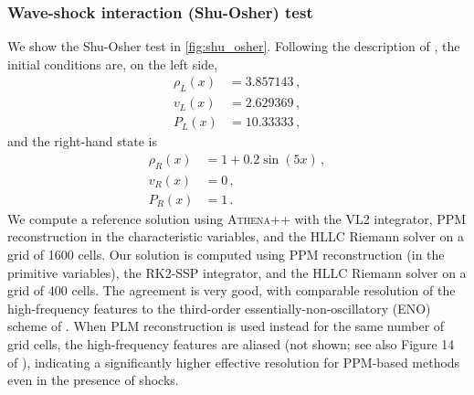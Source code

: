 \documentclass[fleqn,usenatbib]{mnras}
\begin{document}
\subsubsection{Wave-shock interaction (Shu-Osher) test}
\label{section:shu-osher}
We show the Shu-Osher test in \autoref{fig:shu_osher}. Following the description of \cite{Shu_1989}, the initial conditions are, on the left side,
\begin{align}
\rho_L(x) &= 3.857143 \, , \\
v_L(x) &= 2.629369 \, , \\
P_L(x) &= 10.33333 \, ,
\end{align}
and the right-hand state is
\begin{align}
\rho_R(x) &= 1 + 0.2 \sin(5x) \, , \\
v_R(x) &= 0 \, , \\
P_R(x) &= 1 \, .
\end{align}
We compute a reference solution using \textsc{Athena++} \citep{Stone_2020} with the VL2 integrator, PPM reconstruction in the characteristic variables, and the HLLC Riemann solver on a grid of 1600 cells. Our solution is computed using PPM reconstruction (in the primitive variables), the RK2-SSP integrator, and the HLLC Riemann solver on a grid of 400 cells. The agreement is very good, with comparable resolution of the high-frequency features to the third-order essentially-non-oscillatory (ENO) scheme of \cite{Shu_1989}. When PLM reconstruction is used instead for the same number of grid cells, the high-frequency features are aliased (not shown; see also Figure 14 of \citealt{Shu_1989}), indicating a significantly higher effective resolution for PPM-based methods even in the presence of shocks.
\end{document}
